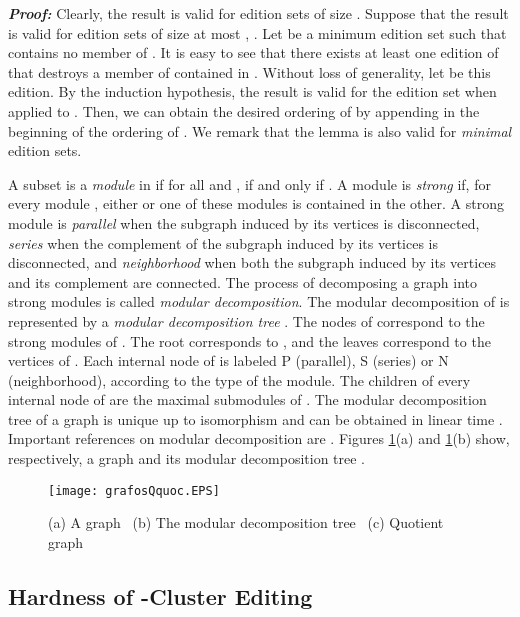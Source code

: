 \documentclass[12pt]{article}
\def\qed{ \fbox \par \medskip }
\def\qed2{ \hfill \framebox[.09in] \par \bigskip }
\begin{document}
\noindent
\emph{\textbf{Proof:}} Clearly, the result is valid for edition sets of size . Suppose that the result is valid for edition sets of size at most , . Let  be a minimum edition set such that  contains no member of . It is easy to see that there exists at least one edition of  that destroys a member of  contained in . Without loss of generality, let  be this edition. By the induction hypothesis, the result is valid for the edition set  when applied to . Then, we can obtain the desired ordering of  by appending  in the beginning of the ordering of . We remark that the lemma is also valid for {\it minimal} edition sets. \qed2


A subset  is a \emph{module} in  if for all
  and ,  if
and only if . A module  is \emph{strong} if,
for every module , either  or one of these
modules is contained in the other. A strong module is
\emph{parallel} when the subgraph induced by its vertices is
disconnected, \emph{series} when the complement of the subgraph
induced by its vertices is disconnected, and \emph{neighborhood}
when both the subgraph induced by its vertices and its complement
are connected. The process of decomposing a graph into strong
modules is called \emph{modular decomposition}. The modular
decomposition of  is represented by a \emph{modular
decomposition tree} . The nodes of  correspond to the
strong modules of . The root corresponds to , and the
leaves correspond to the vertices of .  Each internal node of
 is labeled P (parallel), S (series) or N (neighborhood),
according to the type of the module. The children of every
internal node  of  are the maximal submodules of .
The modular decomposition tree of a graph is unique up to
isomorphism and can be obtained in linear time \cite{MS94}.
Important references on modular decomposition are \cite{BH83,DGC01,G67,HMC2004,MR84,MS94,RJ2000}.
Figures \ref{grafosQquoc}(a) and \ref{grafosQquoc}(b) show,
respectively, a graph  and its modular decomposition tree
.

\begin{figure}[htb]
\begin{center}
\texttt{[image: grafosQquoc.EPS]}
\caption{\label{grafosQquoc}(a) A graph  \ (b) The modular
decomposition tree  \ (c) Quotient graph }
\end{center}
\end{figure}

\subsection{Hardness of {\sc -Cluster Editing}}
\end{document}
